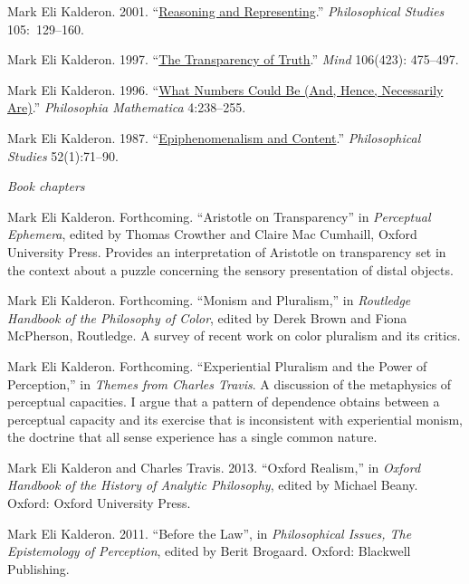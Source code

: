 \documentclass[11pt]{article}
\begin{document}
\ind  Mark Eli Kalderon. 2001.  ``\href{http://www.springerlink.com/content/u5286534982v0317/fulltext.pdf}{Reasoning and Representing}.'' \emph{Philosophical Studies} 105:~129--160.

\ind Mark Eli Kalderon. 1997.
``\href{http://mind.oxfordjournals.org/content/106/423/475.full.pdf}{The Transparency of Truth}.'' \emph{Mind} 106(423): 475--497.

\ind Mark Eli Kalderon. 1996.
``\href{http://philmat.oxfordjournals.org/content/4/3/238.full.pdf}{What Numbers Could Be (And, Hence, Necessarily Are)}.'' \emph{Philosophia Mathematica} 4:238--255.

\ind Mark Eli Kalderon. 1987.
``\href{http://www.jstor.org/stable/4319905}{Epiphenomenalism and Content}.'' \emph{Philosophical Studies} 52(1):71--90.

\bigskip

\noindent\emph{Book chapters \vspace{0.05in}}

\ind Mark Eli Kalderon. Forthcoming. ``Aristotle on Transparency'' in \emph{Perceptual Ephemera}, edited by Thomas Crowther and Claire Mac Cumhaill, Oxford University Press. Provides an interpretation of Aristotle on transparency set in the context about a puzzle concerning the sensory presentation of distal objects.

\ind Mark Eli Kalderon. Forthcoming. ``Monism and Pluralism,'' in \emph{Routledge Handbook of the Philosophy of Color}, edited by Derek Brown and Fiona McPherson, Routledge. A survey of recent work on color pluralism and its critics. 

\ind Mark Eli Kalderon. Forthcoming. ``Experiential Pluralism and the Power of Perception,'' in \emph{Themes from Charles Travis}. A discussion of the metaphysics of perceptual capacities. I argue that a pattern of dependence obtains between a perceptual capacity and its exercise that is inconsistent with experiential monism, the doctrine that all sense experience has a single common nature.

\ind Mark Eli Kalderon and Charles Travis. 2013. ``Oxford Realism,''  in \emph{Oxford Handbook of the History of Analytic Philosophy}, edited by Michael Beany. Oxford: Oxford University Press.

\ind Mark Eli Kalderon. 2011. ``Before the Law'', in \emph{Philosophical Issues, The Epistemology of Perception}, edited by Berit Brogaard. Oxford: Blackwell Publishing.
\end{document}
